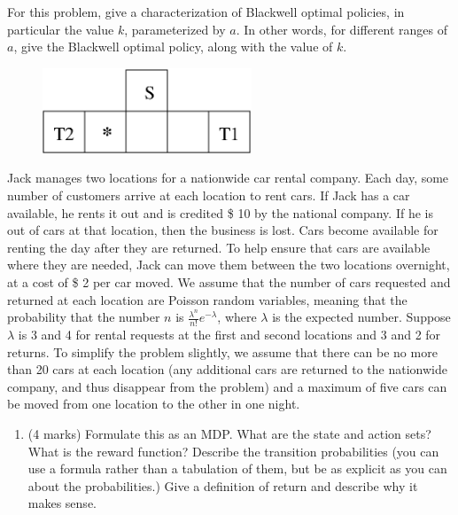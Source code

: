 \documentclass[addpoints,12pt,solution]{exam}
\begin{document}
\begin{questions}
For this problem, give a characterization of Blackwell optimal policies, in
particular the value $k$, parameterized by $a$. In other words, for different ranges of $a$, give the Blackwell optimal policy, along with the value of $k$.


\begin{center}
\begin{figure}[h]
\centerline{\includegraphics[height=1in]{blackwell.eps}}
\end{figure}
\end{center}

\begin{solution}

\end{solution}




 Jack manages two locations for a nationwide car rental company. Each day, some number of customers arrive at each location to rent cars. If Jack has a car available, he rents it out and is credited \$ 10 by the national company. If he is out of cars at that location, then the business is lost. Cars become available for renting the day after they are returned. To help ensure that cars are available where they are needed, Jack can move them between the two locations overnight, at a cost of \$ 2 per car moved. We assume that the number of cars requested and returned at each location are Poisson random variables, meaning that the probability that the number $n$ is $\frac{\lambda^n}{n!}e^{-\lambda}$, where $\lambda$ is the expected number. Suppose $\lambda$ is 3 and 4 for rental requests at the first and second locations and 3 and 2 for returns. To simplify the problem slightly, we assume that there can be no more than 20 cars at each location (any additional cars are returned to the nationwide company, and thus disappear from the problem) and a
maximum of five cars can be moved from one location to the other in one night.

\begin{enumerate}[label=(\alph*)]

\item (4 marks) Formulate this as an MDP. What are the state and action sets? What is the reward function? Describe the transition probabilities (you can use a formula rather than a tabulation of them, but be as explicit as you can about the probabilities.) Give a definition of return and describe why it makes sense.  


\end{enumerate}
\end{questions}
\end{document}
